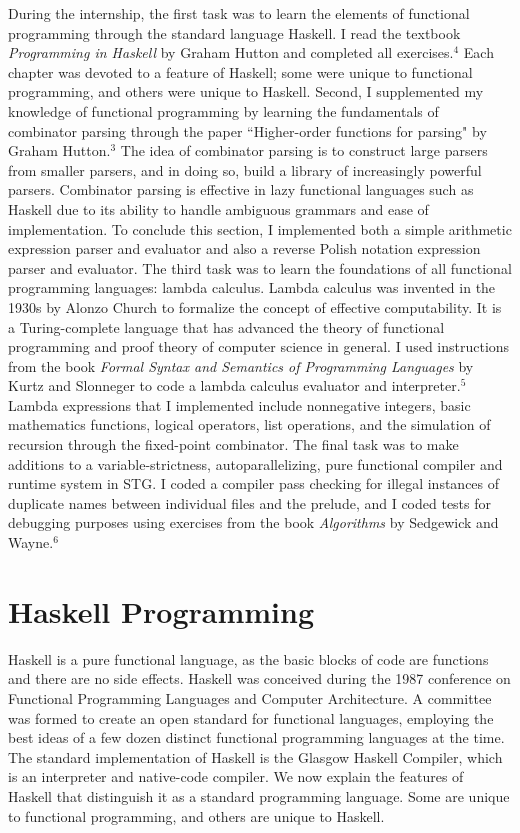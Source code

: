 \documentclass[11pt]{article}
\begin{document}
During the internship, the first task was to learn the elements of functional programming through the standard language Haskell. I read the textbook \textit{Programming in Haskell} by Graham Hutton and completed all exercises.$^4$ Each chapter was devoted to a feature of Haskell; some were unique to functional programming, and others were unique to Haskell. Second, I supplemented my knowledge of functional programming by learning the fundamentals of combinator parsing through the paper ``Higher-order functions for parsing" by Graham Hutton.$^3$ The idea of combinator parsing is to construct large parsers from smaller parsers, and in doing so, build a library of increasingly powerful parsers. Combinator parsing is effective in lazy functional languages such as Haskell due to its ability to handle ambiguous grammars and ease of implementation. To conclude this section, I implemented both a simple arithmetic expression parser and evaluator and also a reverse Polish notation expression parser and evaluator. The third task was to learn the foundations of all functional programming languages: lambda calculus. Lambda calculus was invented in the 1930s by Alonzo Church to formalize the concept of effective computability. It is a Turing-complete language that has advanced the theory of functional programming and proof theory of computer science in general. I used instructions from the book \textit{Formal Syntax and Semantics of Programming Languages} by  Kurtz and Slonneger to code a lambda calculus evaluator and interpreter.$^5$ Lambda expressions that I implemented include nonnegative integers, basic mathematics functions, logical operators, list operations, and the simulation of recursion through the fixed-point combinator. The final task was to make additions to a variable-strictness, autoparallelizing, pure functional compiler and runtime system in STG. I coded a compiler pass checking for illegal instances of duplicate names between individual files and the prelude, and I coded tests for debugging purposes using exercises from the book \emph{Algorithms} by Sedgewick and Wayne.$^6$ 
\section{Haskell Programming}
Haskell is a pure functional language, as the basic blocks of code are functions and there are no side effects. Haskell was conceived during the 1987 conference on Functional Programming Languages and Computer Architecture. A committee was formed to create an open standard for functional languages, employing the best ideas of a few dozen distinct functional programming languages at the time. The standard implementation of Haskell is the Glasgow Haskell Compiler, which is an interpreter and native-code compiler. We now explain the features of Haskell that distinguish it as a standard programming language. Some are unique to functional programming, and others are unique to Haskell.
\end{document}
